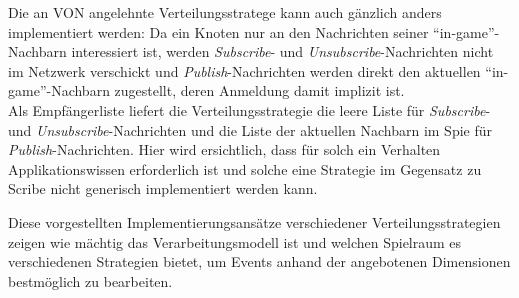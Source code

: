 Die an VON angelehnte Verteilungsstratege kann auch gänzlich anders implementiert werden: Da ein Knoten nur an den Nachrichten seiner \enquote{in-game}-Nachbarn interessiert ist, werden \emph{Subscribe}- und \emph{Unsubscribe}-Nachrichten nicht im Netzwerk verschickt und \emph{Publish}-Nachrichten werden direkt den aktuellen \enquote{in-game}-Nachbarn zugestellt, deren Anmeldung damit implizit ist.\\
Als Empfängerliste liefert die Verteilungsstrategie die leere Liste für \emph{Subscribe}- und \emph{Unsubscribe}-Nachrichten und die Liste der aktuellen Nachbarn im Spie für \emph{Publish}-Nachrichten. Hier wird ersichtlich, dass für solch ein Verhalten Applikationswissen erforderlich ist und solche eine Strategie im Gegensatz zu Scribe nicht generisch implementiert werden kann.

Diese vorgestellten Implementierungsansätze verschiedener Verteilungsstrategien zeigen wie mächtig das Verarbeitungsmodell ist und welchen Spielraum es verschiedenen Strategien bietet, um Events anhand der angebotenen Dimensionen bestmöglich zu bearbeiten.
